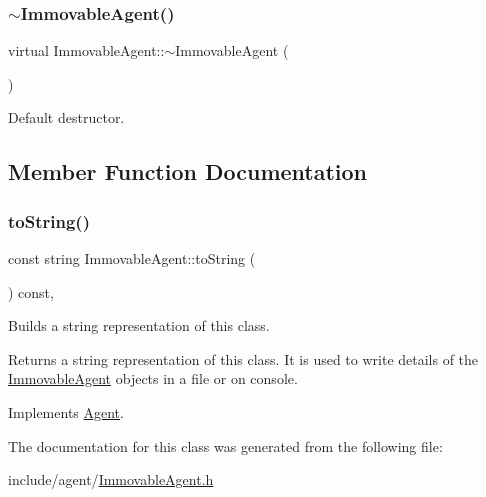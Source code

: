 \subsubsection{\texorpdfstring{$\sim$\+Immovable\+Agent()}{~ImmovableAgent()}}
{\footnotesize\ttfamily virtual Immovable\+Agent\+::$\sim$\+Immovable\+Agent (\begin{DoxyParamCaption}{ }\end{DoxyParamCaption})\hspace{0.3cm}{\ttfamily [virtual]}}

Default destructor. 

\subsection{Member Function Documentation}
\mbox{\label{class_immovable_agent_a805b0d18035550d902d617a8c7ccc062}} 
\subsubsection{\texorpdfstring{to\+String()}{toString()}}
{\footnotesize\ttfamily const string Immovable\+Agent\+::to\+String (\begin{DoxyParamCaption}{ }\end{DoxyParamCaption}) const\hspace{0.3cm}{\ttfamily [override]}, {\ttfamily [virtual]}}

Builds a string representation of this class. \begin{DoxyReturn}{Returns}
a string representation of this class. It is used to write details of the \hyperlink{class_immovable_agent}{Immovable\+Agent} objects in a file or on console. 
\end{DoxyReturn}


Implements \hyperlink{class_agent_a44f291596d10c7878b0641d6ec156328}{Agent}.



The documentation for this class was generated from the following file\+:\begin{DoxyCompactItemize}
\item 
include/agent/\hyperlink{_immovable_agent_8h}{Immovable\+Agent.\+h}\end{DoxyCompactItemize}

